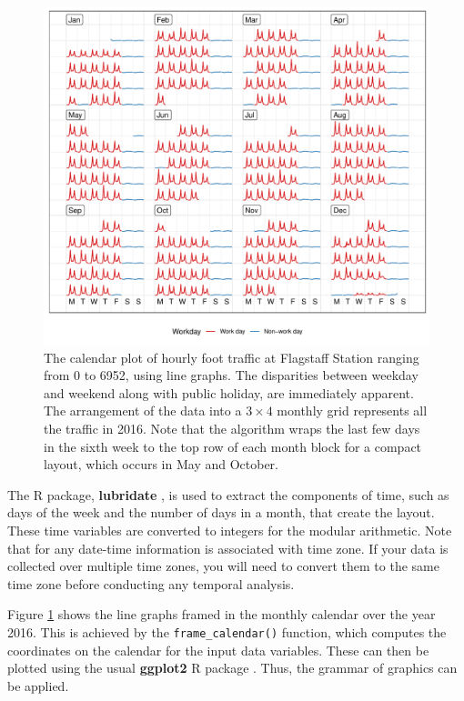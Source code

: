 \documentclass[12pt]{article}
\begin{document}
\begin{figure}

{\centering \includegraphics[width=\textwidth]{figure/fs-2016-1} 

}

\caption{The calendar plot of hourly foot traffic at Flagstaff Station ranging from 0 to 6952, using line graphs. The disparities between weekday and weekend along with public holiday, are immediately apparent. The arrangement of the data into a \(3 \times 4\) monthly grid represents all the traffic in 2016. Note that the algorithm wraps the last few days in the sixth week to the top row of each month block for a compact layout, which occurs in May and October.}\label{fig:fs-2016}
\end{figure}



The R package, \textbf{lubridate} \citep{R-lubridate}, is used to extract the components of time, such as days of the week and the number of days in a month, that create the layout. These time variables are converted to integers for the modular arithmetic. Note that for any date-time information is associated with time zone. If your data is collected over multiple time zones, you will need to convert them to the same time zone before conducting any temporal analysis.

Figure \ref{fig:fs-2016} shows the line graphs framed in the monthly calendar over the year 2016. This is achieved by the \texttt{frame\_calendar()} function, which computes the coordinates on the calendar for the input data variables. These can then be plotted using the usual \textbf{ggplot2} R package \citep{R-ggplot2}. Thus, the grammar of graphics can be applied.
\end{document}
